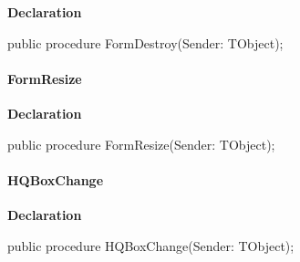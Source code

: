 \documentclass{report}
\newif\ifpdf
\begin{document}
\label{swcatalog.TSCForm-FormDestroy}
\begin{list}{}{
\setlength{\itemindent}{0cm}
\setlength{\listparindent}{0cm}
\setlength{\leftmargin}{\evensidemargin}
\addtolength{\leftmargin}{\tmplength}
\settowidth{\labelsep}{X}
\addtolength{\leftmargin}{\labelsep}
\setlength{\labelwidth}{\tmplength}
}
\item[\textbf{Declaration}\hfill]
\ifpdf
\begin{flushleft}
\fi
\begin{ttfamily}
public procedure FormDestroy(Sender: TObject);\end{ttfamily}

\ifpdf
\end{flushleft}
\fi

\end{list}
\paragraph*{FormResize}\hspace*{\fill}

\label{swcatalog.TSCForm-FormResize}
\begin{list}{}{
\setlength{\itemindent}{0cm}
\setlength{\listparindent}{0cm}
\setlength{\leftmargin}{\evensidemargin}
\addtolength{\leftmargin}{\tmplength}
\settowidth{\labelsep}{X}
\addtolength{\leftmargin}{\labelsep}
\setlength{\labelwidth}{\tmplength}
}
\item[\textbf{Declaration}\hfill]
\ifpdf
\begin{flushleft}
\fi
\begin{ttfamily}
public procedure FormResize(Sender: TObject);\end{ttfamily}

\ifpdf
\end{flushleft}
\fi

\end{list}
\paragraph*{HQBoxChange}\hspace*{\fill}

\label{swcatalog.TSCForm-HQBoxChange}
\begin{list}{}{
\setlength{\itemindent}{0cm}
\setlength{\listparindent}{0cm}
\setlength{\leftmargin}{\evensidemargin}
\addtolength{\leftmargin}{\tmplength}
\settowidth{\labelsep}{X}
\addtolength{\leftmargin}{\labelsep}
\setlength{\labelwidth}{\tmplength}
}
\item[\textbf{Declaration}\hfill]
\ifpdf
\begin{flushleft}
\fi
\begin{ttfamily}
public procedure HQBoxChange(Sender: TObject);\end{ttfamily}

\ifpdf
\end{flushleft}
\fi

\end{list}
\ifpdf
\end{document}
